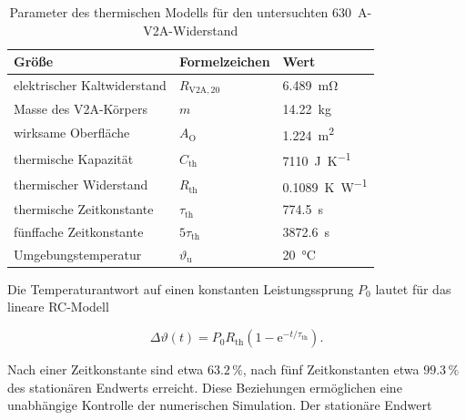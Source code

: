 \begin{table}[H]
    \centering
    \caption{Parameter des thermischen Modells für den untersuchten
    \SI{630}{\ampere}-V2A-Widerstand}
    \label{tab:kap5_thermische_parameter_630}
    \begin{tabular}{@{}lll@{}}
        \toprule
        Größe & Formelzeichen & Wert \\
        \midrule
        elektrischer Kaltwiderstand &
        \(R_{\mathrm{V2A},20}\) &
        \SI{6.489}{\milli\ohm} \\

        Masse des V2A-Körpers &
        \(m\) &
        \SI{14.22}{\kilogram} \\

        wirksame Oberfläche &
        \(A_\mathrm{O}\) &
        \SI{1.224}{\square\metre} \\

        thermische Kapazität &
        \(C_\mathrm{th}\) &
        \SI{7110}{\joule\per\kelvin} \\

        thermischer Widerstand &
        \(R_\mathrm{th}\) &
        \SI{0.1089}{\kelvin\per\watt} \\

        thermische Zeitkonstante &
        \(\tau_\mathrm{th}\) &
        \SI{774.5}{\second} \\

        fünffache Zeitkonstante &
        \(5\tau_\mathrm{th}\) &
        \SI{3872.6}{\second} \\

        Umgebungstemperatur &
        \(\vartheta_\mathrm{u}\) &
        \SI{20}{\degreeCelsius} \\
        \bottomrule
    \end{tabular}
\end{table}

Die Temperaturantwort auf einen konstanten Leistungssprung
\(P_0\) lautet für das lineare RC-Modell

\begin{equation}
    \Delta\vartheta(t)
    =
    P_0R_\mathrm{th}
    \left(1-\mathrm{e}^{-t/\tau_\mathrm{th}}\right).
    \label{eq:kap5_thermische_sprungantwort}
\end{equation}

Nach einer Zeitkonstante sind etwa \(63.2\,\%\), nach fünf
Zeitkonstanten etwa \(99.3\,\%\) des stationären Endwerts erreicht. Diese
Beziehungen ermöglichen eine unabhängige Kontrolle der numerischen
Simulation. Der stationäre Endwert


